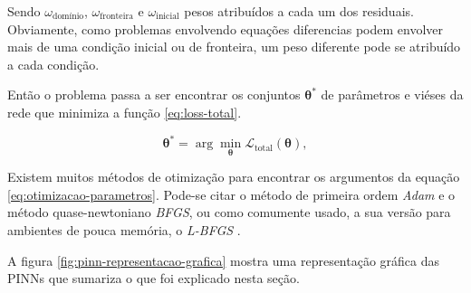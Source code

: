Sendo $\omega_{\text{domínio}}$, $\omega_{\text{fronteira}}$ 
e $\omega_{\text{inicial}}$ pesos atribuídos a cada um dos residuais. 
Obviamente, como problemas envolvendo equações diferencias podem envolver mais
de uma condição inicial ou de fronteira, um peso diferente pode se atribuído a
cada condição.

Então o problema passa a ser encontrar os conjuntos $\boldsymbol{\theta}^*$ de 
parâmetros e viéses da rede que minimiza a função \ref{eq:loss-total}.

\begin{equation}\label{eq:otimizacao-parametros}
   \boldsymbol{\theta}^* 
   = \arg \min_{\boldsymbol{\theta}} \mathcal{L}_{\text{total}}(\boldsymbol{\theta}), 
\end{equation}

Existem muitos métodos de otimização para encontrar os argumentos 
da equação \ref{eq:otimizacao-parametros}. Pode-se citar o método de 
primeira ordem \textit{Adam} \cite{kingma-ba:14-adam} e o método quase-newtoniano
\textit{BFGS}, ou como comumente usado, a sua versão para ambientes de pouca
memória, o \textit{L-BFGS} \cite{liu-nocedal:89-lbfgs}.

A figura \ref{fig:pinn-representacao-grafica} mostra uma representação gráfica das 
PINNs que sumariza o que foi explicado nesta seção.

